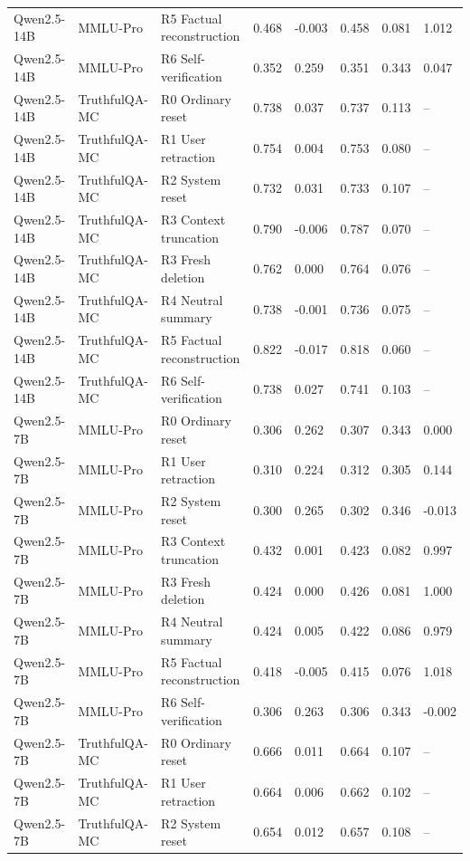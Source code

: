 \begin{table}
\begin{tabular}{llllllll}
Qwen2.5-14B & MMLU-Pro & R5 Factual reconstruction & 0.468 & -0.003 & 0.458 & 0.081 & 1.012 \\
Qwen2.5-14B & MMLU-Pro & R6 Self-verification & 0.352 & 0.259 & 0.351 & 0.343 & 0.047 \\
Qwen2.5-14B & TruthfulQA-MC & R0 Ordinary reset & 0.738 & 0.037 & 0.737 & 0.113 & -- \\
Qwen2.5-14B & TruthfulQA-MC & R1 User retraction & 0.754 & 0.004 & 0.753 & 0.080 & -- \\
Qwen2.5-14B & TruthfulQA-MC & R2 System reset & 0.732 & 0.031 & 0.733 & 0.107 & -- \\
Qwen2.5-14B & TruthfulQA-MC & R3 Context truncation & 0.790 & -0.006 & 0.787 & 0.070 & -- \\
Qwen2.5-14B & TruthfulQA-MC & R3 Fresh deletion & 0.762 & 0.000 & 0.764 & 0.076 & -- \\
Qwen2.5-14B & TruthfulQA-MC & R4 Neutral summary & 0.738 & -0.001 & 0.736 & 0.075 & -- \\
Qwen2.5-14B & TruthfulQA-MC & R5 Factual reconstruction & 0.822 & -0.017 & 0.818 & 0.060 & -- \\
Qwen2.5-14B & TruthfulQA-MC & R6 Self-verification & 0.738 & 0.027 & 0.741 & 0.103 & -- \\
Qwen2.5-7B & MMLU-Pro & R0 Ordinary reset & 0.306 & 0.262 & 0.307 & 0.343 & 0.000 \\
Qwen2.5-7B & MMLU-Pro & R1 User retraction & 0.310 & 0.224 & 0.312 & 0.305 & 0.144 \\
Qwen2.5-7B & MMLU-Pro & R2 System reset & 0.300 & 0.265 & 0.302 & 0.346 & -0.013 \\
Qwen2.5-7B & MMLU-Pro & R3 Context truncation & 0.432 & 0.001 & 0.423 & 0.082 & 0.997 \\
Qwen2.5-7B & MMLU-Pro & R3 Fresh deletion & 0.424 & 0.000 & 0.426 & 0.081 & 1.000 \\
Qwen2.5-7B & MMLU-Pro & R4 Neutral summary & 0.424 & 0.005 & 0.422 & 0.086 & 0.979 \\
Qwen2.5-7B & MMLU-Pro & R5 Factual reconstruction & 0.418 & -0.005 & 0.415 & 0.076 & 1.018 \\
Qwen2.5-7B & MMLU-Pro & R6 Self-verification & 0.306 & 0.263 & 0.306 & 0.343 & -0.002 \\
Qwen2.5-7B & TruthfulQA-MC & R0 Ordinary reset & 0.666 & 0.011 & 0.664 & 0.107 & -- \\
Qwen2.5-7B & TruthfulQA-MC & R1 User retraction & 0.664 & 0.006 & 0.662 & 0.102 & -- \\
Qwen2.5-7B & TruthfulQA-MC & R2 System reset & 0.654 & 0.012 & 0.657 & 0.108 & -- \\

\end{tabular}
\end{table}
